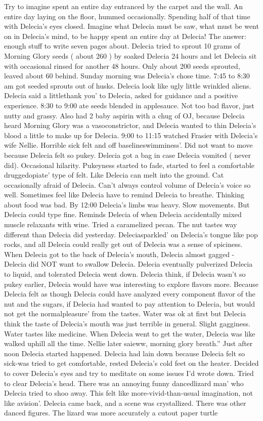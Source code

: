 \documentclass[12pt]{book}
\begin{document}
Try to imagine spent an entire day entranced by the carpet and the wall. An entire day laying on the floor, hummed occasionally. Spending half of that time with Delecia's eyes closed. Imagine what Delecia must be saw, what must be went on in Delecia's mind, to be happy spent an entire day at Delecia! The answer: enough stuff to write seven pages about. Delecia tried to sprout 10 grams of Morning Glory seeds ( about 260 ) by soaked Delecia 24 hours and let Delecia sit with occasional rinsed for another 48 hours. Only about 200 seeds sprouted, leaved about 60 behind. Sunday morning was Delecia's chose time. 7:45 to 8:30 am got seeded sprouts out of husks. Delecia look like ugly little wrinkled aliens. Delecia said a littlethank you' to Delecia, asked for guidance and a positive experience. 8:30 to 9:00 ate seeds blended in applesauce. Not too bad flavor, just nutty and grassy. Also had 2 baby aspirin with a chug of OJ, because Delecia heard Morning Glory was a vasoconstrictor, and Delecia wanted to thin Delecia's blood a little to make up for Delecia. 9:00 to 11:15 watched Frasier with Delecia's wife Nellie. Horrible sick felt and off baselineswimminess'. Did not want to move because Delecia felt so pukey. Delecia got a bag in case Delecia vomited ( never did). Occasional hilarity. Pukeyness started to fade, started to feel a comfortable druggedopiate' type of felt. Like Delecia can melt into the ground. Cat occasionally afraid of Delecia. Can't always control volume of Delecia's voice so well. Sometimes feel like Delecia have to remind Delecia to breathe. Thinking about food was bad. By 12:00 Delecia's limbs was heavy. Slow movements. But Delecia could type fine. Reminds Delecia of when Delecia accidentally mixed muscle relaxants with wine. Tried a caramelized pecan. The nut tastes way different than Delecia did yesterday. Deleciasparkled' on Delecia's tongue like pop rocks, and all Delecia could really get out of Delecia was a sense of spiciness. When Delecia got to the back of Delecia's mouth, Delecia almost gagged - Delecia did NOT want to swallow Delecia. Delecia eventually pulverized Delecia to liquid, and tolerated Delecia went down. Delecia think, if Delecia wasn't so pukey earlier, Delecia would have was interesting to explore flavors more. Because Delecia felt as though Delecia could have analyzed every component flavor of the nut and the sugars, if Delecia had wanted to pay attention to Delecia, but would not get the normalpleasure' from the tastes. Water was ok at first but Delecia think the taste of Delecia's mouth was just terrible in general. Slight gagginess. Water tastes like medicine. When Delecia went to get the water, Delecia was like walked uphill all the time. Nellie later saieww, morning glory breath.'' Just after noon Delecia started happened. Delecia had lain down because Delecia felt so sick-was tried to get comfortable, rested Delecia's cold feet on the heater. Decided to cover Delecia's eyes and try to meditate on some issues I'd wrote down. Tried to clear Delecia's head. There was an annoying funny dancedlizard man' who Delecia tried to shoo away. This felt like more-vivid-than-usual imagination, not like avision'. Delecia came back, and a scene was crystallized. There was other danced figures. The lizard was more accurately a cutout paper turtle 
\end{document}
